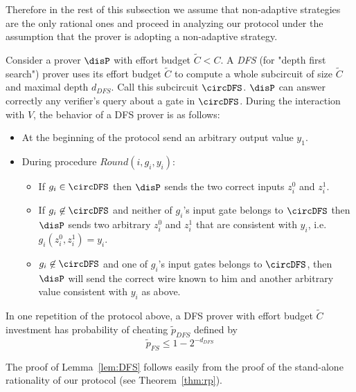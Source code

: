 Therefore in the rest of this subsection we assume that non-adaptive strategies are the only rational ones and proceed in analyzing our protocol 
under the assumption that the prover is adopting a non-adaptive strategy. 


Consider a prover $\disP$ with effort budget $\tilde{C} < C$. A \emph{DFS} (for "depth first search") prover  uses its effort budget $\tilde{C}$ to compute a whole subcircuit of size $\tilde{C}$ and maximal depth $d_{DFS}$. Call this subcircuit $\circDFS$. $\disP$ can answer correctly any verifier's query about a gate in $\circDFS$. During the interaction with $V$, the behavior of a DFS prover is as follows:
\begin{itemize}
\item At the beginning of the protocol send an arbitrary output value $y_1$.
\item During procedure $Round(i, g_i, y_i)$:
\begin{itemize}
\item If $g_i \in \circDFS$  then $\disP$ sends the two correct inputs $z^0_i$ and $z^1_i$.
\item If $g_i \not \in \circDFS$ and neither of $g_i$'s input gate belongs to $\circDFS$ then $\disP$ sends two arbitrary $z^0_i$ and $z^1_i$ that are consistent with $y_i$, i.e. $g_i(z^0_i,z^1_i) = y_i$.
\item $g_i \not \in \circDFS$ and one of $g_i$'s input gates belongs to $\circDFS$, then $\disP$ will send the correct wire known to him and another arbitrary value consistent with $y_i$ as above.
\end{itemize} 
\end{itemize}

\begin{lemma}
\label{lem:DFS}
In one repetition of the protocol above, a DFS prover with effort budget $\tilde{C}$ investment has probability of cheating $\tilde{p}_{DFS}$ defined by 
$$ \tilde{p}_{FS} \leq 1 - 2^{-d_{DFS}}$$
\end{lemma}

The proof of Lemma~\ref{lem:DFS} follows easily from the proof of the stand-alone rationality of our protocol (see Theorem~\ref{thm:rp}). 

